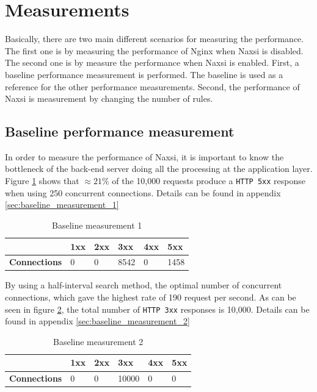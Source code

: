 \documentclass[Measurements]{subfiles}
\begin{document}
\section{Measurements}
\label{sec:Measurements}
Basically, there are two main different scenarios for measuring the performance. The first one is by measuring the performance of Nginx when Naxsi is disabled. The second one is by measure the performance when Naxsi is enabled. First, a baseline performance measurement is performed. The baseline is used as a reference for the other performance measurements. Second, the performance of Naxsi is measurement by changing the number of rules.

\subsection{Baseline performance measurement}
In order to measure the performance of Naxsi, it is important to know the bottleneck of the back-end server doing all the processing at the application layer. Figure \ref{fig:Baseline measurement 1} shows that $\approx 21\%$ of the 10,000 requests produce a \verb+HTTP 5xx+ response when using 250 concurrent connections. Details can be found in appendix \ref{sec:baseline_measurement_1}

\begin{table}[h]
\caption{Baseline measurement 1}
\begin{tabular}{|p{2cm}|p{}|p{}|p{}|p{}|p{}|}
\hline
 & \textbf{1xx} & \textbf{2xx} & \textbf{3xx} & \textbf{4xx} & \textbf{5xx} \\ \hline
\textbf{Connections} & 0 & 0 & 8542 & 0 & 1458 \\ \hline
\end{tabular}
\label{fig:Baseline measurement 1}
\end{table}

By using a half-interval search method, the optimal number of concurrent connections, which gave the highest rate of 190 request per second. As can be seen in figure \ref{fig:Baseline measurement 2}, the total number of \verb+HTTP 3xx+ responses is 10,000. Details can be found in appendix \ref{sec:baseline_measurement_2}

\begin{table}[h]
\caption{Baseline measurement 2}
\begin{tabular}{|p{2cm}|p{}|p{}|p{}|p{}|p{}|}
\hline
 & \textbf{1xx} & \textbf{2xx} & \textbf{3xx} & \textbf{4xx} & \textbf{5xx} \\ \hline
\textbf{Connections} & 0 & 0 & 10000 & 0 & 0 \\ \hline
\end{tabular}
\label{fig:Baseline measurement 2}
\end{table}
\end{document}
